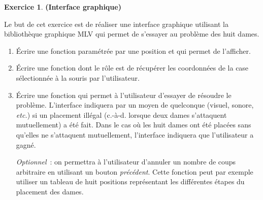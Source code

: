 \documentclass[11pt]{article}
\theoremstyle{definition}
\newtheorem{Exercice}{Exercice}
\begin{document}
\begin{Exercice}{\bf (Interface graphique)}\smallskip

Le but de cet exercice est de réaliser une interface graphique
utilisant la bibliothèque graphique {\sf MLV} qui permet de s'essayer
au problème des huit dames.

\begin{enumerate}
    \item Écrire une fonction paramétrée par une position et qui
    permet de l'afficher.
    \smallskip

    \item Écrire une fonction dont le rôle est de récupérer les
    coordonnées de la case sélectionnée à la souris par l'utilisateur.
    \smallskip

    \item Écrire une fonction qui permet à l'utilisateur d'essayer
    de résoudre le problème. L'interface indiquera par un moyen de
    quelconque (visuel, sonore, {\em etc.}) si un placement
    illégal (c.-à-d. lorsque deux dames s'attaquent mutuellement)
    a été fait. Dans le cas où les huit dames ont été placées sans
    qu'elles ne s'attaquent mutuellement, l'interface indiquera
    que l'utilisateur a gagné.
    \smallskip

    {\em Optionnel}~: on permettra à l'utilisateur d'annuler un
    nombre de coups arbitraire en utilisant un bouton {\em précédent}.
    Cette fonction peut par exemple utiliser un tableau de huit
    positions représentant les différentes étapes du placement des dames.
\end{enumerate}
\end{Exercice}
\bigskip
\end{document}
